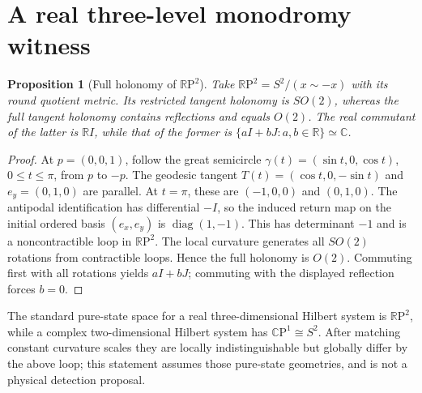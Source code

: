 \documentclass[11pt,letterpaper]{article}
\newtheorem{proposition}[theorem]{Proposition}
\newcommand{\CP}{\mathbb C\mathrm P}
\newcommand{\RP}{\mathbb R\mathrm P}
\begin{document}
\section{A real three-level monodromy witness}
\begin{proposition}[Full holonomy of \(\RP^2\)]\label{prop:rp}
Take \(\RP^2=S^2/(x\sim-x)\) with its round quotient metric. Its restricted tangent holonomy is \(SO(2)\), whereas the full tangent holonomy contains reflections and equals \(O(2)\). The real commutant of the latter is \(\mathbb R I\), while that of the former is \(\{aI+bJ:a,b\in\mathbb R\}\simeq\mathbb C\).
\end{proposition}
\begin{proof}
At \(p=(0,0,1)\), follow the great semicircle \(\gamma(t)=(\sin t,0,\cos t)\), \(0\le t\le\pi\), from \(p\) to \(-p\). The geodesic tangent \(T(t)=(\cos t,0,-\sin t)\) and \(e_y=(0,1,0)\) are parallel. At \(t=\pi\), these are \((-1,0,0)\) and \((0,1,0)\). The antipodal identification has differential \(-I\), so the induced return map on the initial ordered basis \((e_x,e_y)\) is \(\operatorname{diag}(1,-1)\). This has determinant \(-1\) and is a noncontractible loop in \(\RP^2\). The local curvature generates all \(SO(2)\) rotations from contractible loops. Hence the full holonomy is \(O(2)\). Commuting first with all rotations yields \(aI+bJ\); commuting with the displayed reflection forces \(b=0\).
\end{proof}
The standard pure-state space for a real three-dimensional Hilbert system is \(\RP^2\), while a complex two-dimensional Hilbert system has \(\CP^1\cong S^2\). After matching constant curvature scales they are locally indistinguishable but globally differ by the above loop; this statement assumes those pure-state geometries, and is not a physical detection proposal.
\end{document}
